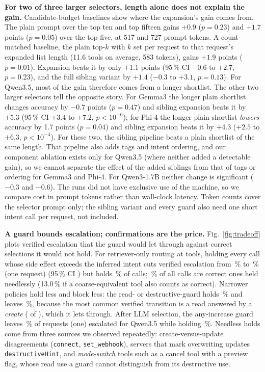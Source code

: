 \textbf{For two of three larger selectors, length alone does not explain the gain.} Candidate-budget baselines show where the
expansion's gain comes from. The plain prompt over the
top ten and top fifteen gains $+0.9$ ($p=0.23$) and $+1.7$ points ($p=0.05$) over the top five, at
517 and 727 prompt tokens. A count-matched baseline, the plain top-$k$ with $k$ set per request to
that request's expanded list length (11.6 tools on average, 583 tokens), gains $+1.9$ points
($p=0.01$). Expansion beats it by only $+1.1$ points (95\,\% CI $-0.6$ to $+2.7$, $p=0.23$), and
the full sibling variant by $+1.4$ ($-0.3$ to $+3.1$, $p=0.13$). For Qwen3.5, most of the gain therefore comes
from a longer shortlist. The other two larger selectors tell the opposite story. For Gemma3 the
longer plain shortlist changes accuracy by $-0.7$ points ($p=0.47$) and sibling expansion beats it
by $+5.3$ (95\,\% CI $+3.4$ to $+7.2$, $p<10^{-6}$); for Phi-4 the longer plain shortlist
\emph{lowers} accuracy by 1.7 points ($p=0.04$) and sibling expansion beats it by $+4.3$
($+2.5$ to $+6.3$, $p<10^{-4}$). For these two, the sibling pipeline beats a plain shortlist of the
same length. That pipeline also adds tags and intent ordering, and our component ablation exists
only for Qwen3.5 (where neither added a detectable gain), so we cannot separate the effect of the
added siblings from that of tags or ordering for Gemma3 and Phi-4. For Qwen3-1.7B neither change is significant ($-0.3$ and $-0.6$). The runs did not have exclusive use of the machine, so we compare cost in prompt tokens
rather than wall-clock latency. Token counts cover the selector prompt only; the sibling variant and
every guard also need one short intent call per request, not included.

\textbf{A guard bounds escalation; confirmations are the price.} Fig.~\ref{fig:tradeoff} plots
verified escalation that the guard would let through against correct selections it would not hold. For
retriever-only routing at \NumPoolTools{} tools, holding every call whose side effect exceeds the
inferred intent cuts verified escalation from \GRNonePoolConf\,\% to \GRAnyPoolConfExec\,\% (one request)
(95\,\% CI \GRAnyPoolExecCI) but holds \GRAnyPoolHeld\,\% of calls; \GRAnyPoolNeedless\,\% of all calls are correct ones held needlessly (13.0\,\% if a coarse-equivalent
tool also counts as correct).
Narrower policies hold less and block less: the read- or destructive-guard holds
\GRRoDPoolHeld\,\% and leaves \GRRoDPoolConfExec\,\%, because the most common verified transition is a
read answered by a \emph{create} (\EscTrueReadCreate{} of \EscTrue), which it lets through. After LLM selection, the any-increase guard leaves \SelQPlainPoolConfExecAny\,\% of requests (one) escalated for Qwen3.5 while holding \SelQPlainPoolHeldAny\,\%. Needless holds come from three
sources we observed repeatedly: create-versus-update disagreements (\texttt{connect},
\texttt{set\_webhook}), servers that mark overwriting updates \texttt{destructiveHint}, and
\emph{mode-switch} tools such as a cancel tool with a preview flag, whose read use a guard cannot
distinguish from its destructive use.

